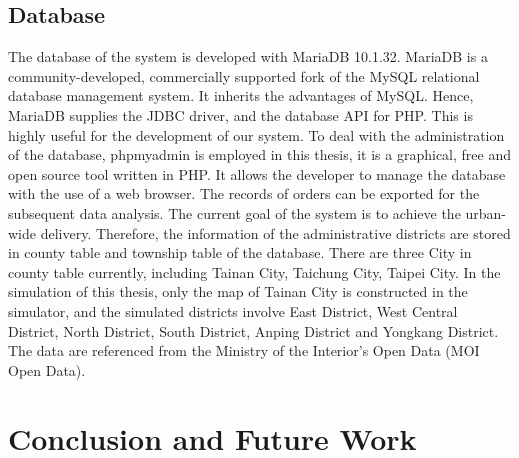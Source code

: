 \documentclass[12pt]{ksthesis}
\begin{document}
\begin{thesis}
{\section{Database}
The database of the system is developed with MariaDB 10.1.32. MariaDB is a community-developed, commercially supported fork of the MySQL relational database management system. It inherits the advantages of MySQL. Hence, MariaDB supplies the JDBC driver, and the database API for PHP. This is highly useful for the development of our system. To deal with the administration of the database, phpmyadmin is employed in this thesis, it is a graphical, free and open source tool written in PHP. It allows the developer to manage the database with the use of a web browser. The records of orders can be exported for the subsequent data analysis.
The current goal of the system is to  achieve the urban-wide delivery. Therefore, the information of the administrative districts are stored in county table and township table of the database. There are three City in county table currently, including Tainan City, Taichung City, Taipei City. In the simulation of this thesis, only the map of Tainan City is constructed in the simulator, and the simulated districts involve East District, West Central District, North District, South District, Anping District and Yongkang District. The data are referenced from the Ministry of the Interior’s Open Data (MOI Open Data).














\chapter{Conclusion and Future Work} \label{Chap:Conclusion}

}
\end{thesis}
\end{document}
